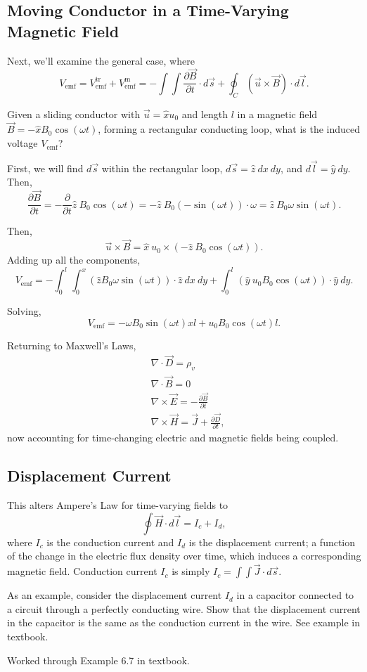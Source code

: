\documentclass{article}
\begin{document}
\subsection{Moving Conductor in a Time-Varying Magnetic Field}

Next, we'll examine the general case, where
\[
	V_{\mathrm{emf}} = V_{\mathrm{emf}}^{\mathrm{tr}} + V_{\mathrm{emf}}^{\mathrm{m}} = -\int\int \frac{\partial \vec{B}}{\partial t} \cdot d \vec{s} + \oint_C(\vec{u} \times \vec{B}) \cdot d \vec{l}.
\]

Given a sliding conductor with \(\vec{u} = \hat{x} u_0\) and length \(l\) in a magnetic field \(\vec{B} = -\hat{x} B_0 \cos{(\omega t)}\), forming a rectangular conducting loop, what is the induced voltage \(V_{\mathrm{emf}}\)?

First, we will find \(d \vec{s}\) within the rectangular loop, \(d \vec{s} = \hat{z} \ dx \ dy\), and \(d \vec{l} = \hat{y} \ dy\). Then, 
\[
	\frac{\partial \vec{B}}{\partial t} = -\frac{\partial }{\partial t} \hat{z} \ B_0 \cos{(\omega t)} = -\hat{z} \ B_0 (-\sin{(\omega t)}) \cdot \omega = \hat{z} \ B_0 \omega \sin{(\omega t)}.
\]

Then, 
\[
	\vec{u} \times \vec{B} = \hat{x} \ u_0 \times (-\hat{z} \ B_0 \cos{(\omega t)}).
\]
Adding up all the components, 
\[
	V_{\mathrm{emf}} = -\int_{0}^{l}\int_{0}^{x}(\hat{z}B_0 \omega \sin{(\omega t)}) \cdot \hat{z} \ dx \ dy + \int_{0}^{l}(\hat{y} \ u_0 B_0 \cos{(\omega t)}) \cdot \hat{y} \ dy.
\]

Solving,
\[
	V_{\mathrm{emf}} = -\omega B_0 \sin{(\omega t)} x l + u_0 B_0 \cos{(\omega t)} l.
\]

Returning to Maxwell's Laws,
\begin{align*}
	&\nabla \cdot \vec{D} = \rho_v \\
	&\nabla \cdot \vec{B} = 0 \\
	&\nabla \times \vec{E} = -\frac{\partial \vec{B}}{\partial t} \\
	&\nabla \times \vec{H} = \vec{J} + \frac{\partial \vec{D}}{\partial t},
\end{align*}
now accounting for time-changing electric and magnetic fields being coupled.

\subsection{Displacement Current}

This alters Ampere's Law for time-varying fields to
\[
  \oint \vec{H} \cdot d \vec{l} = I_c + I_d,
\]
where \(I_c\) is the conduction current and \(I_d\) is the displacement current; a function of the change in the electric flux density over time, which induces a corresponding magnetic field. Conduction current \(I_c\) is simply \(I_c = \int \int \vec{J} \cdot d \vec{s}\). 

As an example, consider the displacement current \(I_d\) in a capacitor connected to a circuit through a perfectly conducting wire. Show that the displacement current in the capacitor is the same as the conduction current in the wire. See example in textbook.

Worked through Example 6.7 in textbook.
\end{document}

